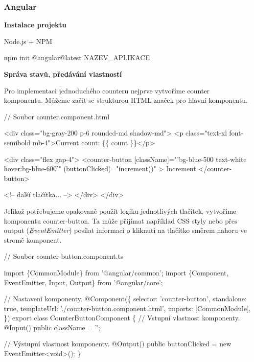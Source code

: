 \subsubsection{Angular}

\begin{flushleft}
  \textbf{Instalace projektu}
\end{flushleft}

\begin{citemize}
	\item Node.js + NPM
  \item npm init @angular@latest NAZEV\_APLIKACE
  \item {}
  \item {}
\end{citemize}

\begin{flushleft}
  \textbf{Správa stavů, předávání vlastností}
\end{flushleft}

Pro implementaci jednoduchého counteru nejprve vytvoříme counter komponentu. Můžeme začít se strukturou HTML značek pro hlavní komponentu.

\begin{prog}
// Soubor counter.component.html

<div class="bg-gray-200 p-6 rounded-md shadow-md">
  <p class="text-xl font-semibold mb-4">Current count: \{\{ count \}\}</p>

  <div class="flex gap-4">
    <counter-button
      [className]="'bg-blue-500 text-white hover:bg-blue-600'"
      (buttonClicked)="increment()"
    >
      Increment
    </counter-button>

    <!-- další tlačítka... -->
  </div>
</div>
\end{prog}

Jelikož potřebujeme opakovaně použít logiku jednotlivých tlačítek, vytvoříme komponentu counter-button. 
Ta může přijímat například CSS styly nebo přes output (\emph{EventEmitter}) posílat informaci o kliknutí na tlačítko směrem nahoru ve stromě komponent.

\begin{prog}
// Soubor counter-button.component.ts

import \{CommonModule\} from '@angular/common';
import \{Component, EventEmitter, Input, Output\} from '@angular/core';

// Nastavení komponenty.
@Component(\{
  selector: 'counter-button',
  standalone: true,
  templateUrl: './counter-button.component.html',
  imports: [CommonModule],
\})
export class CounterButtonComponent \{
  // Vstupní vlastnost komponenty.
  @Input() public className = '';

  // Výstupní vlastnost komponenty.
  @Output() public buttonClicked = new EventEmitter<void>();
\}
\end{prog}

